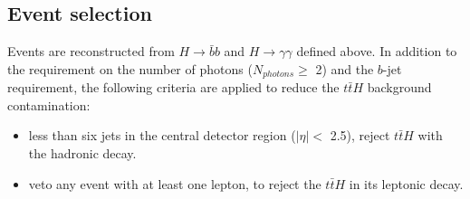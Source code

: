 
\subsection{Event selection}
\label{HHyybb:ObjEvt:Evt}
Events are reconstructed from $H\to\bar{b}b$ and $H\to\gamma\gamma$ defined above. In addition to the requirement on the number of photons ($N_{photons} \geq $ 2) and the $b$-jet requirement, the following criteria are applied to reduce the $t\bar{t}H$ background contamination: 

\begin{itemize}
    \protect
    \item less than six jets in the central detector region ($|\eta| < $ 2.5), reject $t\bar{t}H$ with the hadronic decay. 
    \item veto any event with at least one lepton, to reject the $t\bar{t}H$ in its leptonic decay.  
\end{itemize}

